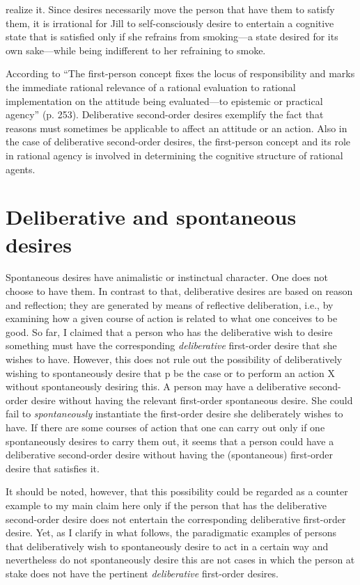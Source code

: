\documentclass[output=paper,colorlinks,citecolor=brown
]{langscibook}
\begin{document}
realize it. Since desires necessarily move the person that have them to satisfy them, it is irrational for Jill to self-consciously desire to entertain a cognitive state that is satisfied only if she refrains from smoking—a state desired for its own sake—while being indifferent to her refraining to smoke.

According to \citet{burge1998reason} “The first-person concept fixes the locus of responsibility and marks the immediate rational relevance of a rational evaluation to rational implementation on the attitude being evaluated—to epistemic or practical agency” (p. 253). Deliberative second-order desires exemplify the fact that reasons must sometimes be applicable to affect an attitude or an action. Also in the case of deliberative second-order desires, the first-person concept and its role in rational agency is involved in determining the cognitive structure of rational agents.   




\section{Deliberative and spontaneous desires}
    
Spontaneous desires have animalistic or instinctual character. One does not choose to have them. In contrast to that, deliberative desires are based on reason and reflection; they are generated by means of reflective deliberation, i.e., by examining how a given course of action is related to what one conceives to be good. So far, I claimed that a person who has the deliberative wish to desire something must have the corresponding \textit{deliberative} first-order desire that she wishes to have. However, this does not rule out the possibility of deliberatively wishing to spontaneously desire that p be the case or to perform an action X without spontaneously desiring this. A person may have a deliberative second-order desire without having the relevant first-order spontaneous desire. She could fail to \textit{spontaneously} instantiate the first-order desire she deliberately wishes to have. If there are some courses of action that one can carry out only if one spontaneously desires to carry them out, it seems that a person could have a deliberative second-order desire without having the (spontaneous) first-order desire that satisfies it.

It should be noted, however, that this possibility could be regarded as a counter example to my main claim here only if the person that has the deliberative second-order desire does not entertain the corresponding deliberative first-order desire. Yet, as I clarify in what follows, the paradigmatic examples of persons that deliberatively wish to spontaneously desire to act in a certain way and nevertheless do not spontaneously desire this are not cases in which the person at stake does not have the pertinent \textit{deliberative} first-order desires. 
\end{document}
